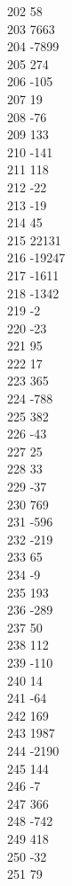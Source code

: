 { 202	58 \\
 203	7663 \\
 204	-7899 \\
 205	274 \\
 206	-105 \\
 207	19 \\
 208	-76 \\
 209	133 \\
 210	-141 \\
 211	118 \\
 212	-22 \\
 213	-19 \\
 214	45 \\
 215	22131 \\
 216	-19247 \\
 217	-1611 \\
 218	-1342 \\
 219	-2 \\
 220	-23 \\
 221	95 \\
 222	17 \\
 223	365 \\
 224	-788 \\
 225	382 \\
 226	-43 \\
 227	25 \\
 228	33 \\
 229	-37 \\
 230	769 \\
 231	-596 \\
 232	-219 \\
 233	65 \\
 234	-9 \\
 235	193 \\
 236	-289 \\
 237	50 \\
 238	112 \\
 239	-110 \\
 240	14 \\
 241	-64 \\
 242	169 \\
 243	1987 \\
 244	-2190 \\
 245	144 \\
 246	-7 \\
 247	366 \\
 248	-742 \\
 249	418 \\
 250	-32 \\
 251	79 \\
}
